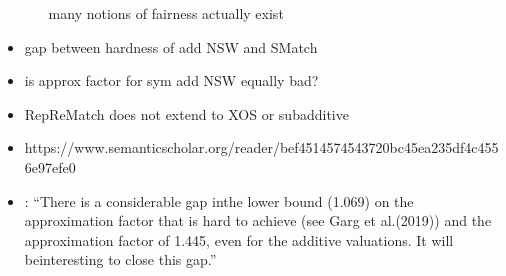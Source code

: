 \begin{itemize}
\begin{itemize}
			many notions of fairness actually exist
		\end{itemize}

		\item
		gap between hardness of add NSW and SMatch

		\item
		is approx factor for sym add NSW equally bad?

		\item
		RepReMatch does not extend to XOS or subadditive

		\item
		https://www.semanticscholar.org/reader/bef4514574543720bc45ea235df4c4556e97efe0

		\item
		\cite{fair_division_of_indiv_goods_for_a_class_of_concave_valuations}:
		\enquote{There is a considerable gap inthe lower bound (1.069) on the approximation factor that is hard to achieve (see Garg et al.(2019)) and the approximation factor of 1.445, even for the additive valuations.  It will beinteresting to close this gap.}
\end{itemize}